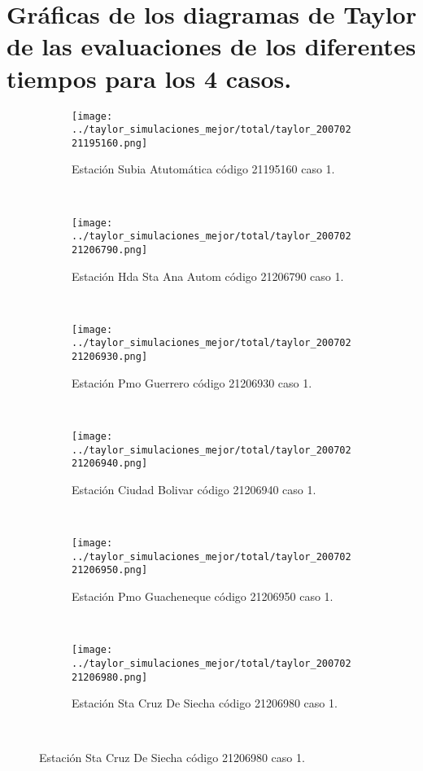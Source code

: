 \chapter{Gráficas de los diagramas de Taylor de las evaluaciones de los diferentes tiempos para los 4 casos.}
\label{anexo:graficas_taylor_tiempos_4casos}

\begin{figure}[H]
 
 
 
\begin{subfigure}[normla]{0.4\textwidth}
\texttt{[image: ../taylor\_simulaciones\_mejor/total/taylor\_20070221195160.png]}
\caption{Estación Subia Atutomática código 21195160 caso 1.}
\end{subfigure}
~
\begin{subfigure}[normla]{0.4\textwidth}
\texttt{[image: ../taylor\_simulaciones\_mejor/total/taylor\_20070221206790.png]}
\caption{Estación Hda Sta Ana Autom código 21206790 caso 1.}
\end{subfigure}
~
\begin{subfigure}[normla]{0.4\textwidth}
\texttt{[image: ../taylor\_simulaciones\_mejor/total/taylor\_20070221206930.png]}
\caption{Estación Pmo Guerrero código 21206930 caso 1.}
\end{subfigure}
~
\begin{subfigure}[normla]{0.4\textwidth}
\texttt{[image: ../taylor\_simulaciones\_mejor/total/taylor\_20070221206940.png]}
\caption{Estación Ciudad Bolivar código 21206940 caso 1.}
\end{subfigure}
~
\begin{subfigure}[normla]{0.4\textwidth}
\texttt{[image: ../taylor\_simulaciones\_mejor/total/taylor\_20070221206950.png]}
\caption{Estación Pmo Guacheneque código 21206950 caso 1.}
\end{subfigure}
~
\begin{subfigure}[normla]{0.4\textwidth}
\texttt{[image: ../taylor\_simulaciones\_mejor/total/taylor\_20070221206980.png]}
\caption{Estación Sta Cruz De Siecha código 21206980 caso 1.}
\end{subfigure}
~
\end{figure}
 
